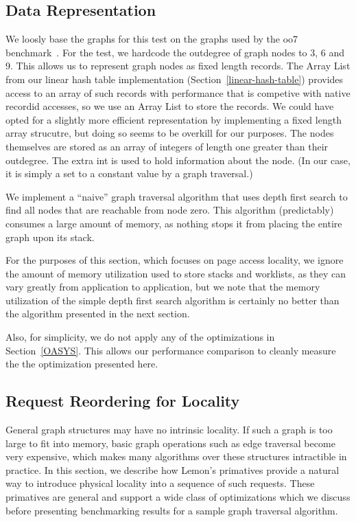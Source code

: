\documentclass[letterpaper,twocolumn,english]{article}
\newcommand{\yad}{Lemon\xspace}
\begin{document}
\subsection {Data Representation}

We loosly base the graphs for this test on the graphs used by the oo7
benchmark~\cite{oo7}.  For the test, we hardcode the outdegree of
graph nodes to 3, 6 and 9.  This allows us to represent graph nodes as
fixed length records.  The Array List from our linear hash table
implementation (Section~\ref{linear-hash-table}) provides access to an
array of such records with performance that is competive with native
recordid accesses, so we use an Array List to store the records.  We
could have opted for a slightly more efficient representation by
implementing a fixed length array strucutre, but doing so seems to be
overkill for our purposes.  The nodes themselves are stored as an
array of integers of length one greater than their outdegree. The
extra int is used to hold information about the node.  (In our case,
it is simply a set to a constant value by a graph traversal.)

We implement a ``naive'' graph traversal algorithm that uses depth
first search to find all nodes that are reachable from node zero.
This algorithm (predictably) consumes a large amount of memory, as
nothing stops it from placing the entire graph upon its stack.  

For the purposes of this section, which focuses on page access
locality, we ignore the amount of memory utilization used to store
stacks and worklists, as they can vary greatly from application to
application, but we note that the memory utilization of the simple
depth first search algorithm is certainly no better than the algorithm
presented in the next section.

Also, for simplicity, we do not apply any of the optimizations in
Section~\ref{OASYS}.  This allows our performance comparison to
cleanly measure the the optimization presented here.

\subsection {Request Reordering for Locality}

General graph structures may have no intrinsic locality.  If such a
graph is too large to fit into memory, basic graph operations such as
edge traversal become very expensive, which makes many algorithms over
these structures intractible in practice.  In this section, we
describe how \yad's primatives provide a natural way to introduce
physical locality into a sequence of such requests.  These primatives
are general and support a wide class of optimizations which we discuss
before presenting benchmarking results for a sample graph traversal
algorithm.
\end{document}
